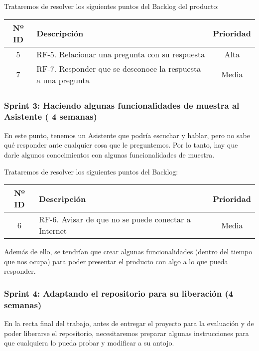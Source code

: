 Trataremos de resolver los siguientes puntos del Backlog del producto:
\begin{table}[H]
	\begin{tabularx}{\textwidth}{|c|X|c|}
		\hline
		\textbf{Nº ID} & \textbf{Descripción} & \textbf{Prioridad} \\
		\hline
			5 & RF-5. Relacionar una pregunta con su respuesta & Alta \\
		\hline
			7 & RF-7. Responder que se desconoce la respuesta a una pregunta & Media \\
		\hline
	\end{tabularx}
\end{table}

\subsubsection{Sprint 3: Haciendo algunas funcionalidades de muestra al Asistente ( 4 semanas)}

En este punto, tenemos un Asistente que podría escuchar y hablar, pero no sabe qué responder ante cualquier cosa que le preguntemos. Por lo tanto, hay que darle algunos conocimientos con algunas funcionalidades de muestra.

Trataremos de resolver los siguientes puntos del Backlog:
\begin{table}[H]
	\begin{tabularx}{\textwidth}{|c|X|c|}
		\hline
		\textbf{Nº ID} & \textbf{Descripción} & \textbf{Prioridad} \\
		\hline
			6 & RF-6. Avisar de que no se puede conectar a Internet & Media \\
		\hline
	\end{tabularx}
\end{table}

Además de ello, se tendrían que crear algunas funcionalidades (dentro del tiempo que nos ocupa) para poder presentar el producto con algo a lo que pueda responder.

\subsubsection{Sprint 4: Adaptando el repositorio para su liberación (4 semanas)}

En la recta final del trabajo, antes de entregar el proyecto para la evaluación y de poder liberarse el repositorio, necesitaremos preparar algunas instrucciones para que cualquiera lo pueda probar y modificar a su antojo.

